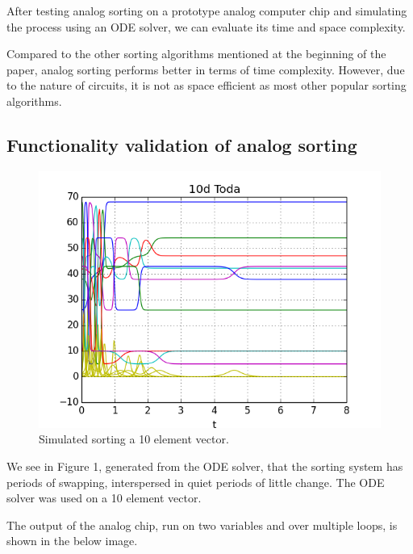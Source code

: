 After testing analog sorting on a prototype analog computer chip and simulating the process using an ODE solver, we can evaluate its time and space complexity. 

Compared to the other sorting algorithms mentioned at the beginning of the paper, analog sorting performs better in terms of time complexity. However, due to the nature of circuits, it is not as space efficient as most other popular sorting algorithms.

\subsection{Functionality validation of analog sorting}

\begin{figure}[h]
\centering
\includegraphics[width=\columnwidth]{graphics/10d_toda_7.png}
\caption{Simulated sorting a 10 element vector.}
\end{figure}

We see in Figure 1, generated from the ODE solver, that the sorting system has periods of swapping, interspersed in quiet periods of little change. The ODE solver was used on a 10 element vector. 

The output of the analog chip, run on two variables and over multiple loops, is shown in the below image.

